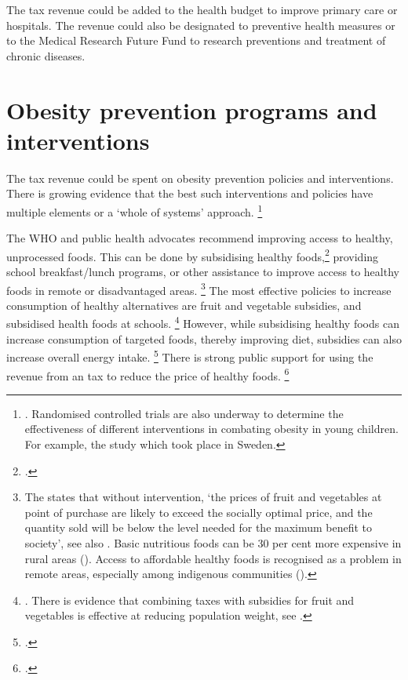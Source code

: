 \documentclass[embargoed]{grattan}
\begin{document}
The \SSB{} tax revenue could be added to the health budget to improve primary care or hospitals.
The revenue could also be designated to preventive health measures or to the Medical Research Future Fund to research preventions and treatment of chronic diseases.

\section{Obesity prevention programs and interventions }\label{obesity-prevention-programs-and-interventions}

The \SSB{} tax revenue could be spent on obesity prevention policies and interventions.
There is growing evidence that the best such interventions and policies have multiple elements or a `whole of systems' approach.%
\footnote{\textcites{Ewart-Pierce2016WholeCommunityObesity}{Health2016Insufficientphysicalactivity}{Hawkes2015Smartfoodpolicies}{Organization2016FiscalPoliciesDiet}{Roberto2012Factsfrontversus}{Mckinsey2014overcomingobesity}.
Randomised controlled trials are also underway to determine the effectiveness of different interventions in combating obesity in young children.
For example, the \textcite{Sobko2011randomisedcontrolledtrial} study which took place in Sweden.}

The WHO and public health advocates recommend improving access to healthy, unprocessed foods.
This can be done by subsidising healthy foods,\footcites{LordanShouldweput}{Organization2016FiscalPoliciesDiet} providing school breakfast/lunch programs, or other assistance to improve access to healthy foods in remote or disadvantaged areas.%
\footnote{The \textcite{Organisation2015Usingpricepolicies} states that without intervention, `the prices of fruit and vegetables at point of purchase are likely to exceed the socially optimal price, and the quantity sold will be below the level needed for the maximum benefit to society', see also \textcite{Kaplin2013Usingeconomicpolicy}.
Basic nutritious foods can be 30 per cent more expensive in rural areas (\textcite{Health2012Australiasfood}).
Access to affordable healthy foods is recognised as a problem in remote areas, especially among indigenous communities (\textcite{Thurber2014OverweightobesityIndigenous}).} The most effective policies to increase consumption of healthy alternatives are fruit and vegetable subsidies, and subsidised health foods at schools.%
\footnote{\textcites{Kaplin2013Usingeconomicpolicy}{Thow2014systematicrevieweffectiveness}{An2013Eatingbetterless}. {There is evidence that combining taxes with subsidies for fruit and vegetables is effective at reducing population weight, see \textcite{Organization2016FiscalPoliciesDiet}}.} However, while subsidising healthy foods can increase consumption of targeted foods, thereby improving diet, subsidies can also increase overall energy intake.%
\footcites{Kaplin2013Usingeconomicpolicy}{Organization2016FiscalPoliciesDiet}{Cawley2015economyscalesselective} There is strong public support for using the revenue from an \SSB{} tax to reduce the price of healthy foods.%
\footcite{Morley2012Publicopinionfood}
\end{document}
